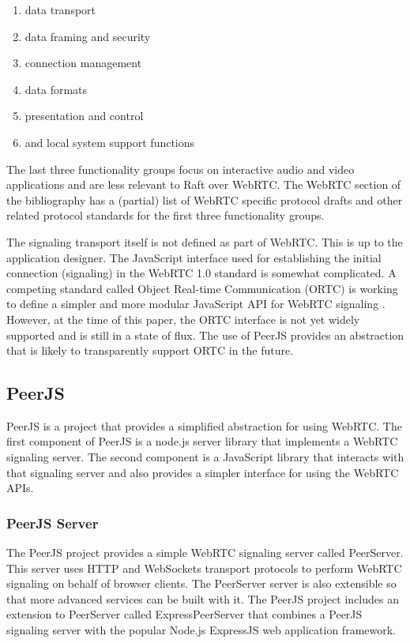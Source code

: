 \documentclass[9pt]{extarticle}
\begin{document}
\begin{multicols}{2}
\begin{enumerate}
    \item data transport
    \item data framing and security
    \item connection management
    \item data formats
    \item presentation and control
    \item and local system support functions
\end{enumerate}

The last three functionality groups focus on interactive audio and video
applications and are less relevant to Raft over WebRTC. The WebRTC
section of the bibliography %
has a (partial) list of WebRTC specific protocol drafts and other
related protocol standards for the first three functionality groups.

The signaling transport itself is not defined as part of WebRTC.
This is up to the application designer. The JavaScript interface used
for establishing the initial connection (signaling) in the WebRTC 1.0
standard is somewhat complicated. A competing standard called Object
Real-time Communication (ORTC) is working to define a simpler and more
modular JavaScript API for WebRTC signaling \cite{ortc2014}. However,
at the time of this paper, the ORTC interface is not yet widely
supported and is still in a state of flux. The use of PeerJS provides an
abstraction that is likely to transparently support ORTC in the future.

\subsection{PeerJS}

PeerJS is a project that provides a simplified abstraction for using
WebRTC. The first component of PeerJS is a node.js server library that
implements a WebRTC signaling server. The second component is
a JavaScript library that interacts with that signaling server and
also provides a simpler interface for using the WebRTC APIs.

\subsubsection{PeerJS Server}

The PeerJS project provides a simple WebRTC signaling server called
PeerServer. This server uses HTTP and WebSockets transport protocols
to perform WebRTC signaling on behalf of browser clients. The
PeerServer server is also extensible so that more advanced services
can be built with it. The PeerJS project includes an extension to
PeerServer called ExpressPeerServer that combines a PeerJS signaling
server with the popular Node.js ExpressJS web application framework.


\end{multicols}
\end{document}
